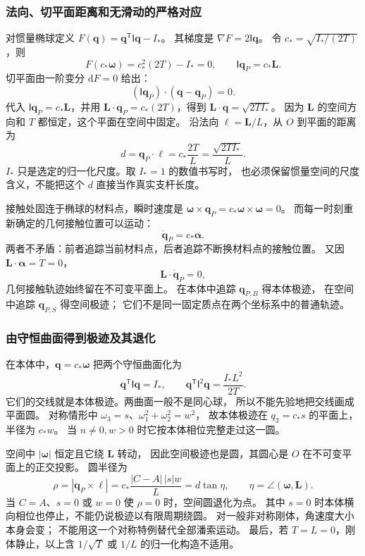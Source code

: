 \documentclass[UTF8,zihao=-4,fontset=fandol,a4paper]{ctexart}
\newcommand{\vect}[1]{\bm{#1}}
\newcommand{\dd}{\mathrm d}
\begin{document}
\subsubsection*{法向、切平面距离和无滑动的严格对应}
对惯量椭球定义
$F(\vect q)=\vect q^{\mathsf T}\mathsf I\vect q-I_*$。
其梯度是 $\nabla F=2\mathsf I\vect q$。
令 $c_* =\sqrt{I_*/(2T)}$，则
\[
F(c_*\vect\omega)=c_*^2(2T)-I_*=0,
\qquad\mathsf I\vect q_P=c_*\vect L.
\]
切平面由一阶变分 $\dd F=0$ 给出：
\[
(\mathsf I\vect q_P)\cdot(\vect q-\vect q_P)=0.
\]
代入 $\mathsf I\vect q_P=c_*\vect L$，并用
$\vect L\cdot\vect q_P=c_*(2T)$，得到
$\vect L\cdot\vect q=\sqrt{2TI_*}$。
因为 $\vect L$ 的空间方向和 $T$ 都恒定，这个平面在空间中固定。
沿法向 $\vect\ell=\vect L/L$，从 $O$ 到平面的距离为
\[
d=\vect q_P\cdot\vect\ell
=c_*\frac{2T}{L}=\frac{\sqrt{2TI_*}}{L}.
\]
$I_*$ 只是选定的归一化尺度。取 $I_*=1$ 的数值书写时，
也必须保留惯量空间的尺度含义，不能把这个 $d$ 直接当作真实支杆长度。

接触处固连于椭球的材料点，瞬时速度是
$\vect\omega\times\vect q_P=c_*\vect\omega\times\vect\omega=0$。
而每一时刻重新确定的几何接触位置可以运动：
\[
\dot{\vect q}_P=c_*\vect\alpha.
\]
两者不矛盾：前者追踪当前材料点，后者追踪不断换材料点的接触位置。
又因 $\vect L\cdot\vect\alpha=\dot T=0$，
\[
\vect L\cdot\dot{\vect q}_P=0,
\]
几何接触轨迹始终留在不可变平面上。
在本体中追踪 $\vect q_{P,B}$ 得本体极迹，
在空间中追踪 $\vect q_{P,S}$ 得空间极迹；
它们不是同一固定质点在两个坐标系中的普通轨迹。

\subsubsection*{由守恒曲面得到极迹及其退化}
在本体中，$\vect q=c_*\vect\omega$ 把两个守恒曲面化为
\[
\vect q^{\mathsf T}\mathsf I\vect q=I_*,\qquad
\vect q^{\mathsf T}\mathsf I^2\vect q=
\frac{I_*L^2}{2T}.
\]
它们的交线就是本体极迹。两曲面一般不是同心球，
所以不能先验地把交线画成平面圆。
对称情形中 $\omega_3=s$、$\omega_1^2+\omega_2^2=w^2$，
故本体极迹在 $q_3=c_*s$ 的平面上，半径为 $c_*w$。
当 $n\ne0,w>0$ 时它按本体相位完整走过这一圆。

空间中 $|\vect\omega|$ 恒定且它绕 $\vect L$ 转动，
因此空间极迹也是圆，其圆心是 $O$ 在不可变平面上的正交投影。
圆半径为
\[
\rho=|\vect q_P\times\vect\ell|
=c_*\frac{|C-A|\,|s|w}{L}
=d\tan\eta,
\qquad\eta=\angle(\vect\omega,\vect L).
\]
当 $C=A$、$s=0$ 或 $w=0$ 使 $\rho=0$ 时，空间圆退化为点。
其中 $s=0$ 时本体横向相位也停止，不能仍说极迹以有限周期绕圆。
对一般非对称刚体，角速度大小本身会变；
不能用这一个对称特例替代全部潘索运动。
最后，若 $T=L=0$，刚体静止，以上含 $1/\sqrt T$ 或 $1/L$ 的归一化构造不适用。
\end{document}
